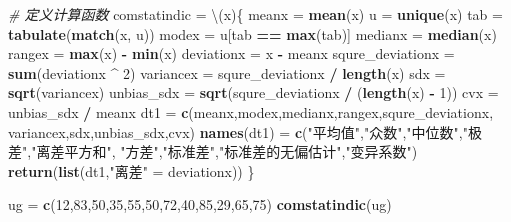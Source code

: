 \documentclass[
]{article}
\newenvironment{Shaded}{\begin{snugshade}}{\end{snugshade}}
\newcommand{\CommentTok}[1]{\textcolor[rgb]{0.56,0.35,0.01}{\textit{#1}}}
\newcommand{\DecValTok}[1]{\textcolor[rgb]{0.00,0.00,0.81}{#1}}
\newcommand{\FunctionTok}[1]{\textcolor[rgb]{0.13,0.29,0.53}{\textbf{#1}}}
\newcommand{\NormalTok}[1]{#1}
\newcommand{\OtherTok}[1]{\textcolor[rgb]{0.56,0.35,0.01}{#1}}
\newcommand{\SpecialCharTok}[1]{\textcolor[rgb]{0.81,0.36,0.00}{\textbf{#1}}}
\newcommand{\StringTok}[1]{\textcolor[rgb]{0.31,0.60,0.02}{#1}}
\begin{document}
\begin{Shaded}
\begin{Highlighting}[]
\CommentTok{\# 定义计算函数}
\NormalTok{comstatindic }\OtherTok{=}\NormalTok{ \textbackslash{}(x)\{}
\NormalTok{  meanx }\OtherTok{=} \FunctionTok{mean}\NormalTok{(x)}
\NormalTok{  u }\OtherTok{=} \FunctionTok{unique}\NormalTok{(x)}
\NormalTok{  tab }\OtherTok{=} \FunctionTok{tabulate}\NormalTok{(}\FunctionTok{match}\NormalTok{(x, u))}
\NormalTok{  modex }\OtherTok{=}\NormalTok{ u[tab }\SpecialCharTok{==} \FunctionTok{max}\NormalTok{(tab)]}
\NormalTok{  medianx }\OtherTok{=} \FunctionTok{median}\NormalTok{(x)}
\NormalTok{  rangex }\OtherTok{=} \FunctionTok{max}\NormalTok{(x) }\SpecialCharTok{{-}} \FunctionTok{min}\NormalTok{(x)}
\NormalTok{  deviationx }\OtherTok{=}\NormalTok{ x }\SpecialCharTok{{-}}\NormalTok{ meanx}
\NormalTok{  squre\_deviationx }\OtherTok{=} \FunctionTok{sum}\NormalTok{(deviationx }\SpecialCharTok{\^{}} \DecValTok{2}\NormalTok{)}
\NormalTok{  variancex }\OtherTok{=}\NormalTok{ squre\_deviationx }\SpecialCharTok{/} \FunctionTok{length}\NormalTok{(x)}
\NormalTok{  sdx }\OtherTok{=} \FunctionTok{sqrt}\NormalTok{(variancex)}
\NormalTok{  unbias\_sdx }\OtherTok{=} \FunctionTok{sqrt}\NormalTok{(squre\_deviationx }\SpecialCharTok{/}\NormalTok{ (}\FunctionTok{length}\NormalTok{(x) }\SpecialCharTok{{-}} \DecValTok{1}\NormalTok{))}
\NormalTok{  cvx }\OtherTok{=}\NormalTok{ unbias\_sdx }\SpecialCharTok{/}\NormalTok{ meanx}
\NormalTok{  dt1 }\OtherTok{=} \FunctionTok{c}\NormalTok{(meanx,modex,medianx,rangex,squre\_deviationx,}
\NormalTok{          variancex,sdx,unbias\_sdx,cvx)}
  \FunctionTok{names}\NormalTok{(dt1) }\OtherTok{=} \FunctionTok{c}\NormalTok{(}\StringTok{"平均值"}\NormalTok{,}\StringTok{"众数"}\NormalTok{,}\StringTok{"中位数"}\NormalTok{,}\StringTok{"极差"}\NormalTok{,}\StringTok{"离差平方和"}\NormalTok{,}
                 \StringTok{"方差"}\NormalTok{,}\StringTok{"标准差"}\NormalTok{,}\StringTok{"标准差的无偏估计"}\NormalTok{,}\StringTok{"变异系数"}\NormalTok{)}
  \FunctionTok{return}\NormalTok{(}\FunctionTok{list}\NormalTok{(dt1,}\StringTok{"离差"} \OtherTok{=}\NormalTok{ deviationx))}
\NormalTok{\}}

\NormalTok{ug }\OtherTok{=} \FunctionTok{c}\NormalTok{(}\DecValTok{12}\NormalTok{,}\DecValTok{83}\NormalTok{,}\DecValTok{50}\NormalTok{,}\DecValTok{35}\NormalTok{,}\DecValTok{55}\NormalTok{,}\DecValTok{50}\NormalTok{,}\DecValTok{72}\NormalTok{,}\DecValTok{40}\NormalTok{,}\DecValTok{85}\NormalTok{,}\DecValTok{29}\NormalTok{,}\DecValTok{65}\NormalTok{,}\DecValTok{75}\NormalTok{)}
\FunctionTok{comstatindic}\NormalTok{(ug)}
\end{Highlighting}
\end{Shaded}
\end{document}
